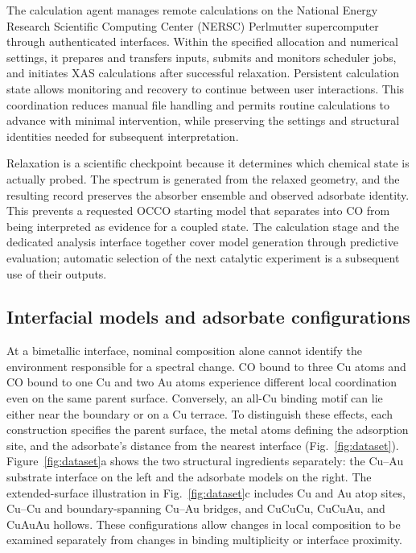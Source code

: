 \documentclass[11pt,a4paper]{article}
\begin{document}
The calculation agent manages remote calculations on the National Energy Research Scientific Computing Center (NERSC) Perlmutter supercomputer through authenticated interfaces.\cite{nersc} Within the specified allocation and numerical settings, it prepares and transfers inputs, submits and monitors scheduler jobs, and initiates XAS calculations after successful relaxation. Persistent calculation state allows monitoring and recovery to continue between user interactions. This coordination reduces manual file handling and permits routine calculations to advance with minimal intervention, while preserving the settings and structural identities needed for subsequent interpretation.

Relaxation is a scientific checkpoint because it determines which chemical state is actually probed. The spectrum is generated from the relaxed geometry, and the resulting record preserves the absorber ensemble and observed adsorbate identity. This prevents a requested OCCO starting model that separates into CO from being interpreted as evidence for a coupled state. The calculation stage and the dedicated analysis interface together cover model generation through predictive evaluation; automatic selection of the next catalytic experiment is a subsequent use of their outputs.

\subsection{Interfacial models and adsorbate configurations}
At a bimetallic interface, nominal composition alone cannot identify the environment responsible for a spectral change. CO bound to three Cu atoms and CO bound to one Cu and two Au atoms experience different local coordination even on the same parent surface. Conversely, an all-Cu binding motif can lie either near the boundary or on a Cu terrace. To distinguish these effects, each construction specifies the parent surface, the metal atoms defining the adsorption site, and the adsorbate's distance from the nearest interface (Fig.~\ref{fig:dataset}). Figure~\ref{fig:dataset}a shows the two structural ingredients separately: the Cu--Au substrate interface on the left and the adsorbate models on the right. The extended-surface illustration in Fig.~\ref{fig:dataset}c includes Cu and Au atop sites, Cu--Cu and boundary-spanning Cu--Au bridges, and CuCuCu, CuCuAu, and CuAuAu hollows. These configurations allow changes in local composition to be examined separately from changes in binding multiplicity or interface proximity.
\end{document}
